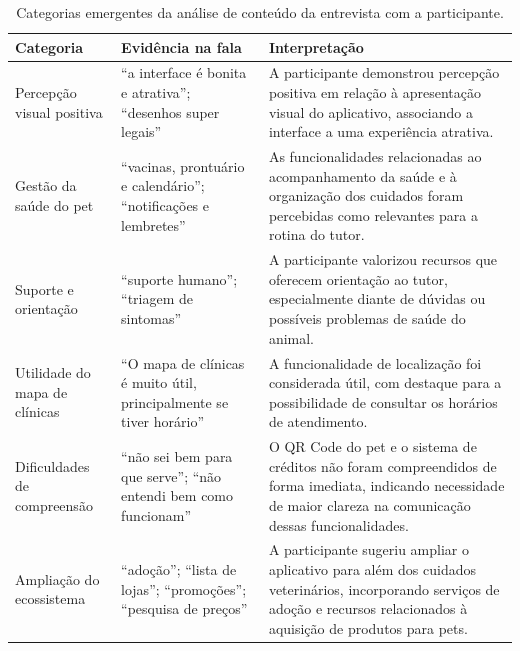 \documentclass[12pt,a4paper]{article}
\begin{document}
\begin{table}[h!]
\centering
\small
\begin{tabular}{@{}>{\raggedright\arraybackslash}p{3.5cm}>{\raggedright\arraybackslash}p{5.3cm}>{\raggedright\arraybackslash}p{4.5cm}@{}}
\toprule
\textbf{Categoria} & \textbf{Evidência na fala} & \textbf{Interpretação} \\
\midrule

Percepção visual positiva &
\enquote{a interface é bonita e atrativa}; \enquote{desenhos super legais} &
A participante demonstrou percepção positiva em relação à apresentação visual do aplicativo,
associando a interface a uma experiência atrativa. \\

\addlinespace

Gestão da saúde do pet &
\enquote{vacinas, prontuário e calendário}; \enquote{notificações e lembretes} &
As funcionalidades relacionadas ao acompanhamento da saúde e à organização dos cuidados
foram percebidas como relevantes para a rotina do tutor. \\

\addlinespace

Suporte e orientação &
\enquote{suporte humano}; \enquote{triagem de sintomas} &
A participante valorizou recursos que oferecem orientação ao tutor, especialmente diante
de dúvidas ou possíveis problemas de saúde do animal. \\

\addlinespace

Utilidade do mapa de clínicas &
\enquote{O mapa de clínicas é muito útil, principalmente se tiver horário} &
A funcionalidade de localização foi considerada útil, com destaque para a possibilidade
de consultar os horários de atendimento. \\

\addlinespace

Dificuldades de compreensão &
\enquote{não sei bem para que serve}; \enquote{não entendi bem como funcionam} &
O QR Code do pet e o sistema de créditos não foram compreendidos de forma imediata,
indicando necessidade de maior clareza na comunicação dessas funcionalidades. \\

\addlinespace

Ampliação do ecossistema &
\enquote{adoção}; \enquote{lista de lojas}; \enquote{promoções}; \enquote{pesquisa de preços} &
A participante sugeriu ampliar o aplicativo para além dos cuidados veterinários, incorporando
serviços de adoção e recursos relacionados à aquisição de produtos para pets. \\

\bottomrule
\end{tabular}
\caption{Categorias emergentes da análise de conteúdo da entrevista com a participante.}
\label{tab:categorias}
\end{table}
\end{document}
